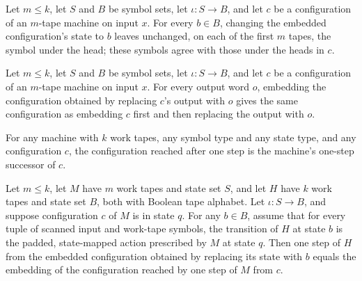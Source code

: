 \begin{theorem}
\label{Turing.embedCfg_workTapeSymbols}
\leanok
{}
Let $m\leq k$, let $S$ and $B$ be symbol sets, let $\iota:S\to B$, and let $c$ be a
configuration of an $m$-tape machine on input $x$. For every $b\in B$, changing the
embedded configuration's state to $b$ leaves unchanged, on each of the first $m$ tapes,
the symbol under the head; these symbols agree with those under the heads in $c$.
\end{theorem}

\begin{theorem}
\label{Turing.embedCfg_output}
\leanok
{}
Let $m \leq k$, let $S$ and $B$ be symbol sets, let $\iota:S\to B$, and let $c$ be a
configuration of an $m$-tape machine on input $x$. For every output word $o$, embedding
the configuration obtained by replacing $c$'s output with $o$ gives the same
configuration as embedding $c$ first and then replacing the output with $o$.
\end{theorem}

\begin{theorem}
\label{Turing.MultiTapeTM.runFrom_one}
\leanok
{}
For any machine with $k$ work tapes, any symbol type and any state type, and any
configuration $c$, the configuration reached after one step is the machine's one-step
successor of $c$.
\end{theorem}

\begin{theorem}
\label{Turing.embed_step}
\leanok
{}
Let $m\le k$, let $M$ have $m$ work tapes and state set $S$, and let $H$ have $k$ work
tapes and state set $B$, both with Boolean tape alphabet. Let $\iota:S\to B$, and
suppose configuration $c$ of $M$ is in state $q$. For any $b\in B$, assume that for
every tuple of scanned input and work-tape symbols, the transition of $H$ at state $b$
is the padded, state-mapped action prescribed by $M$ at state $q$. Then one step of $H$
from the embedded configuration obtained by replacing its state with $b$ equals the
embedding of the configuration reached by one step of $M$ from $c$.
\end{theorem}

